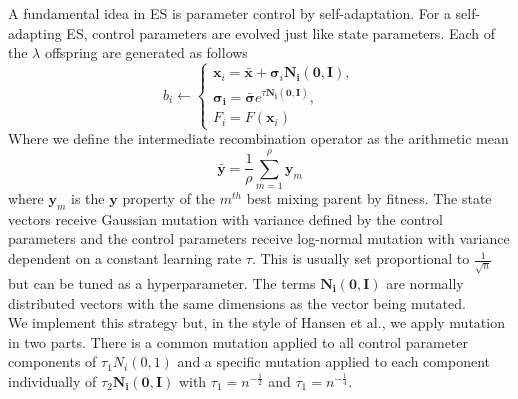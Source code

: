 A fundamental idea in ES is parameter control by self-adaptation. For a self-adapting ES, control parameters are evolved just like state parameters. Each of the $\lambda$ offspring are generated as follows
\[b_i \gets
\begin{cases}
    \bm{x}_i = \bar{\bm{x}} + \bm{\sigma}_i\bm{N_i(0, I)},\\
    \bm{\sigma_i} = \bar{\bm{\sigma}}e^{\tau\bm{N_i(0, I)}},\\
    F_i = F(\bm{x}_i)
\end{cases}
\]
Where we define the intermediate recombination operator as the arithmetic mean
\[
  \bar{\bm{y}} = \frac{1}{\rho}\sum_{m=1}^{\rho}{\bm{y}_m}
\]
where $\bm{y}_m$ is the $\bm{y}$ property of the $m^{th}$ best mixing parent by fitness. The state vectors receive Gaussian mutation with variance defined by the control parameters and the control parameters receive log-normal mutation with variance dependent on a constant learning rate $\tau$. This is usually set proportional to $\frac{1}{\sqrt{n}}$ but can be tuned as a hyperparameter. The terms $\bm{N_i(0, I)}$ are normally distributed vectors with the same dimensions as the vector being mutated.\\

We implement this strategy but, in the style of Hansen et al.\cite{hansen2015evolution}, we apply mutation in two parts. There is a common mutation applied to all control parameter components of $\tau_1{N_i(0, 1)}$ and a specific mutation applied to each component individually of $\tau_2\bm{N_i(0, I)}$ with $\tau_1 = n^{-\frac{1}{2}}$ and $\tau_1 = n^{-\frac{1}{4}}$.\\



